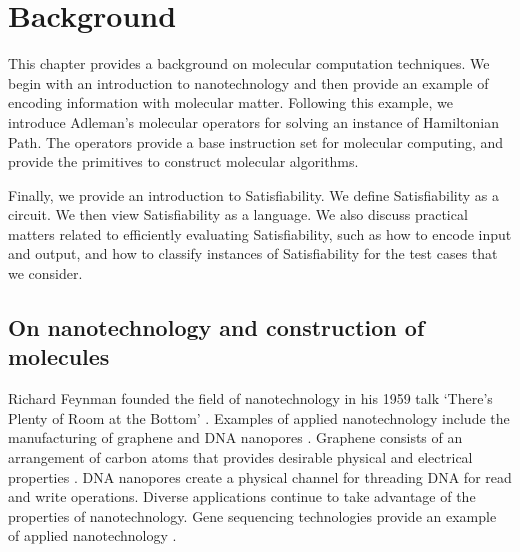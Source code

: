 \chapter{Background}


This chapter provides a background on molecular computation techniques.  We begin with an introduction to nanotechnology and then provide an example of encoding information with molecular matter.  Following this example, we introduce Adleman's molecular operators for solving an instance of {\sc Hamiltonian Path}.  The operators provide a base instruction set for molecular computing, and provide the primitives to construct molecular algorithms.

Finally, we provide an introduction to {\sc Satisfiability}.  We define {\sc Satisfiability} as a circuit.  We then view {\sc Satisfiability} as a language.  We also discuss practical matters related to efficiently evaluating {\sc Satisfiability}, such as how to encode input and output, and how to classify instances of {\sc Satisfiability} for the test cases that we consider.

\section{On nanotechnology and construction of molecules}

		
	Richard Feynman founded the field of nanotechnology in his 1959 talk `There's Plenty of Room at the Bottom' \cite{feynman1959}.  Examples of applied nanotechnology include the manufacturing of graphene \cite{Stankovich_Dikin_Dommett_Kohlhaas_Zimney_Stach_Piner_Nguyen_Ruoff_2006} and DNA nanopores \cite{dnaTransistorIBMpressrelease}. Graphene consists of an arrangement of carbon atoms that provides desirable physical and electrical properties \cite{Stankovich_Dikin_Dommett_Kohlhaas_Zimney_Stach_Piner_Nguyen_Ruoff_2006}. DNA nanopores create a physical channel for threading DNA for read and write operations.  Diverse applications continue to take advantage of the properties of nanotechnology.  Gene sequencing technologies provide an example of applied nanotechnology \cite{ionTorrent, oxfordNanopore}.  					
		
